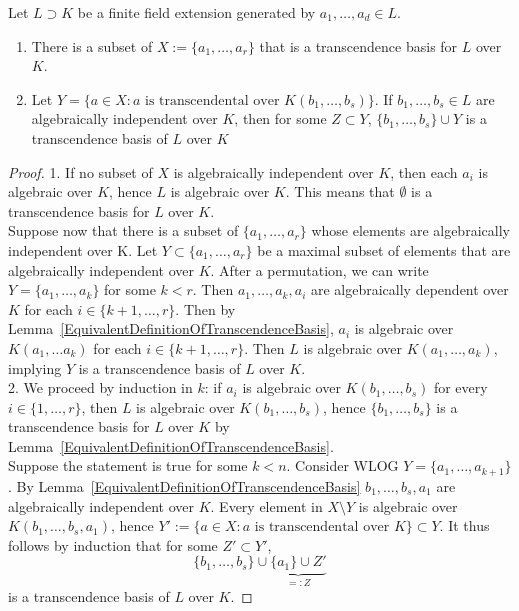 \begin{lemma}\label{TechnicalTranscendenceBasisLemma}
    Let $L\supset K$ be a finite field extension generated by $a_1,\dots,a_d\in L$. 
    \begin{enumerate}
        \item There is a subset of $X:= \{a_1,\dots,a_r\}$ that is a transcendence basis for $L$ over $K$.
        \item Let $Y=\{ a \in X : a \text{ is transcendental over } K(b_1,\dots,b_s)\}$. If $b_1,\dots,b_s\in L$ are algebraically independent over $K$, then for some $Z\subset Y$, $\{b_1,\dots, b_s\}\cup Y$ is a transcendence basis of $L$ over $K$ 
    \end{enumerate}
\end{lemma}
\begin{proof}
    1. If no subset of $X$ is algebraically independent over $K$, then each $a_i$ is algebraic over $K$, hence $L$ is algebraic over $K$. This means that $\emptyset$ is a transcendence basis for $L$ over $K$.\\ 
    Suppose now that there is a subset of $\{a_1,\dots,a_r\}$ whose elements are algebraically independent over K.  Let $Y\subset\{a_1,\dots,a_r\}$ be a maximal subset of elements that are algebraically independent over $K$. After a permutation, we can write $Y=\{a_1,\dots,a_k\}$ for some $k<r$. Then $a_1,\dots,a_k,a_i$ are algebraically dependent over $K$ for each $i\in\{k+1,\dots,r\}$. Then by Lemma~\ref{EquivalentDefinitionOfTranscendenceBasis}, $a_i$ is algebraic over $K(a_1,\dots a_k)$ for each $i\in\{k+1,\dots, r\}$. Then $L$ is algebraic over $K(a_1,\dots,a_k)$, implying $Y$ is a transcendence basis of $L$ over $K$.\\
    2. We proceed by induction in $k$: if $a_i$ is algebraic over $K(b_1,\dots,b_s)$ for every $i\in\{1,\dots,r\}$, then $L$ is algebraic over $K(b_1,\dots,b_s)$, hence $\{b_1,\dots,b_s\}$ is a transcendence basis for $L$ over $K$ by Lemma~\ref{EquivalentDefinitionOfTranscendenceBasis}.\\
    Suppose the statement is true for some $k<n$. Consider WLOG $Y= \{a_1,\dots,a_{k+1}\}$. By Lemma~\ref{EquivalentDefinitionOfTranscendenceBasis} $b_1,\dots,b_s,a_1$ are algebraically independent over $K$. Every element in $X\setminus Y$ is algebraic over $K(b_1,\dots,b_s, a_1)$, hence $Y':= \{ a \in X : a \text{ is transcendental over } K\}\subset Y$. It thus follows by induction that for some $Z'\subset Y'$, 
    $$\{b_1,\dots,b_s\}\cup \underbrace{\{a_1\}\cup Z'}_{=:Z}$$ 
    is a transcendence basis of $L$ over $K$.
\end{proof}

